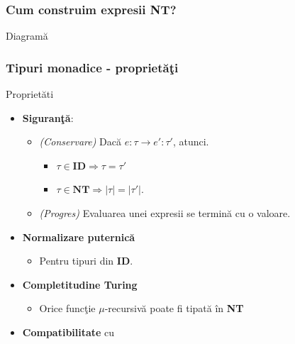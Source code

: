 \documentclass[]{prezentare}
\newcommand\sfrec{\text{$System\ F^{rec}\ $}}
\begin{document}
    \begin{frame}
        \frametitle{Cum construim expresii NT?}

        \begin{exampleblock}
        {
         {
         }
        }
        
        \end{exampleblock}

        \begin{exampleblock}{Diagram\u a}
        \end{exampleblock}
    \end{frame}
    \begin{frame}
        \frametitle{Tipuri monadice - propriet\u a\c ti}
        \begin{block}{Propriet\u ati}
        \begin{itemize}
        \item {\bf Siguran\c t\u a}:
            \begin{itemize}
                \item \textit{(Conservare)} Dac\u a $e:\tau \to e':\tau'$, atunci.
                    \begin{itemize}
                        \item $\tau \in \textbf{ID} \Rightarrow \tau = \tau'$
                        \item $\tau \in \textbf{NT} \Rightarrow |\tau| = |\tau'|$.
                    \end{itemize}
                \item \textit{(Progres)} Evaluarea unei expresii se termin\u a cu o valoare.
            \end{itemize}
        \item {\bf Normalizare puternic\u a}
            \begin{itemize}
                \item Pentru tipuri din \textbf{ID}.
            \end{itemize}
        \item {\bf Completitudine Turing}
            \begin{itemize}
                \item Orice func\c tie $\mu$-recursiv\u a poate fi tipat\u a \^ in \textbf{NT}
            \end{itemize}
        \item {\bf Compatibilitate} cu \sfrec
        \end{itemize}
        \end{block}
    \end{frame}
\end{document}
